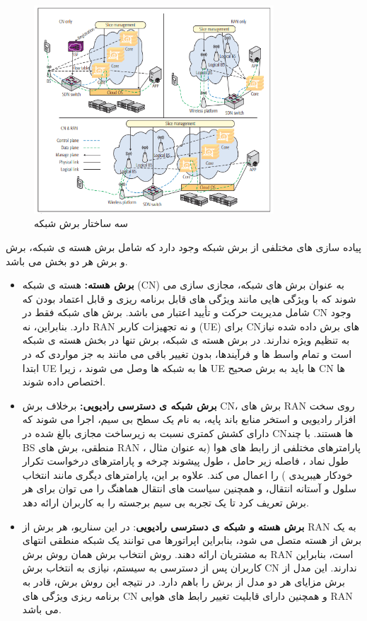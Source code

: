 \begin{figure}
  \centering
    \includegraphics[width=0.8\textwidth]{./fig/NS}
  \caption{سه ساختار برش شبکه \cite{NS2}}
  \label{fig:NS}
\end{figure} 
پیاده سازی های مختلفی از برش شبکه وجود دارد که شامل برش هسته ی شبکه، برش  و برش هر دو بخش می باشد\cite{NS2}.
\begin{itemize}
\item \textbf{برش هسته:}
هسته ی شبکه (CN) 
به عنوان برش های شبکه، مجازی سازی می شوند که با ویژگی هایی مانند ویژگی های قابل برنامه ریزی و قابل اعتماد بودن که شامل مدیریت حرکت و تأیید اعتبار می باشد.
برش های شبکه فقط در CN وجود دارد.
  بنابراین، نه RAN و نه تجهیزات کاربر (UE) برای CNهای برش داده شده نیاز به تنظیم ویژه ندارند.
  در برش هسته ی شبکه، برش تنها در بخش هسته ی شبکه است و تمام واسط ها و فرآیندها، بدون تغییر باقی می مانند
  به جز مواردی که در ابتدا UE ها به شبکه ها وصل می شوند ، زیرا UE ها باید به برش صحیح CN ها اختصاص داده شوند.
\item \textbf{
برش شبکه ی دسترسی رادیویی:
}
برخلاف برش CN،
برش های RAN روی سخت افزار رادیویی و استخر منابع باند پایه، به نام یک سطح بی سیم، اجرا می شوند که دارای کشش کمتری نسبت به زیرساخت مجازی بالغ شده در CNها هستند.
با چند BS منطقی، برش های RAN پارامترهای مختلفی از رابط های هوا (به عنوان مثال ، طول نماد ، فاصله زیر حامل ، طول پیشوند چرخه و پارامترهای درخواست تکرار خودکار هیبریدی ) را اعمال می کند.
علاوه بر این، پارامترهای دیگری مانند انتخاب سلول و آستانه انتقال، و همچنین سیاست های انتقال هماهنگ را می توان برای هر برش تعریف کرد تا یک تجربه بی سیم برجسته را به کاربران ارائه دهد.
\item \textbf{برش هسته و شبکه ی دسترسی رادیویی}:
در این سناریو، هر برش از RAN به یک برش از هسته متصل می شود، بنابراین اپراتورها می توانند یک شبکه منطقی انتهای به مشتریان ارائه دهند.
روش انتخاب برش همان روش برش RAN است، بنابراین کاربران پس از دسترسی به سیستم، نیازی به انتخاب برش CN ندارند.
این مدل از برش مزایای هر دو مدل از برش را باهم دارد.
 در نتیجه این روش برش، قادر به برنامه ریزی ویژگی های CN و همچنین دارای قابلیت تغییر رابط های هوایی RAN
 می باشد.
 
\end{itemize}
